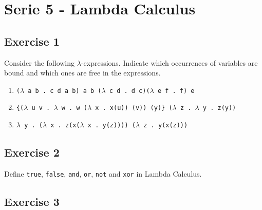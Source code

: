 \documentclass [11pt, a4wide, twoside]{article}
\begin{document}
\section*{Serie 5 - Lambda Calculus}
\subsection*{Exercise 1}

Consider the following $\lambda$-expressions. Indicate which occurrences of
variables are bound and which ones are free in the expressions.
\begin{enumerate}
\item \texttt{($\lambda$ a b .~c d a b) a b ($\lambda$ c d .~d c)($\lambda$ e f .~f) e}

\item \texttt{\{($\lambda$ u v .~$\lambda$ w .~w ($\lambda$ x .~x(u)) (v)) (y)\} ($\lambda$ z .~$\lambda$ y .~z(y))}

\item \texttt{$\lambda$ y .~($\lambda$ x .~z(x($\lambda$ x .~y(z)))) ($\lambda$ z .~y(x(z)))}
\end{enumerate}


%
\subsection*{Exercise 2}

Define \verb!true!, \verb!false!, \verb!and!, \verb!or!, \verb!not! and \verb!xor! in Lambda Calculus.

%
\subsection*{Exercise 3}
\end{document}
